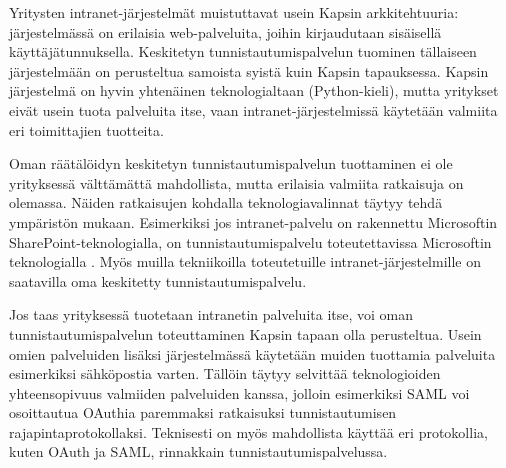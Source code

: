 Yritysten intranet-järjestelmät muistuttavat usein Kapsin arkkitehtuuria: järjestelmässä on erilaisia web-palveluita, joihin kirjaudutaan sisäisellä käyttäjätunnuksella. Keskitetyn tunnistautumispalvelun tuominen tällaiseen järjestelmään on perusteltua samoista syistä kuin Kapsin tapauksessa. Kapsin järjestelmä on hyvin yhtenäinen teknologialtaan (Python-kieli), mutta yritykset eivät usein tuota palveluita itse, vaan intranet-järjestelmissä käytetään valmiita eri toimittajien tuotteita.

Oman räätälöidyn keskitetyn tunnistautumispalvelun tuottaminen ei ole yrityksessä välttämättä mahdollista, mutta erilaisia valmiita ratkaisuja on olemassa. Näiden ratkaisujen kohdalla teknologiavalinnat täytyy tehdä ympäristön mukaan. Esimerkiksi jos intranet-palvelu on rakennettu Microsoftin SharePoint-teknologialla, on tunnistautumispalvelu toteutettavissa Microsoftin teknologialla \cite{sharepoint}. Myös muilla tekniikoilla toteutetuille intranet-järjestelmille on saatavilla oma keskitetty tunnistautumispalvelu.

Jos taas yrityksessä tuotetaan intranetin palveluita itse, voi oman tunnistautumispalvelun toteuttaminen Kapsin tapaan olla perusteltua. Usein omien palveluiden lisäksi järjestelmässä käytetään muiden tuottamia palveluita esimerkiksi sähköpostia varten. Tällöin täytyy selvittää teknologioiden yhteensopivuus valmiiden palveluiden kanssa, jolloin esimerkiksi SAML voi osoittautua OAuthia paremmaksi ratkaisuksi tunnistautumisen rajapintaprotokollaksi. Teknisesti on myös mahdollista käyttää eri protokollia, kuten OAuth ja SAML, rinnakkain tunnistautumispalvelussa.